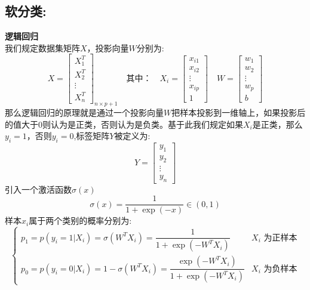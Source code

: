\documentclass[withoutpreface,bwprint]{cumcmthesis} %
\begin{document}
	\subsection{\Large 软分类:}
	\textbf{逻辑回归}\\
	我们规定数据集矩阵$X$，投影向量$W$分别为:
	\begin{equation*}
		X=\left[
			\begin{array}{c}
				X_1^T\\
				X_2^T\\
				\vdots\\
				X_n^T
			\end{array}
		\right]_{n\times{p+1}} \quad \textbf{其中：}\quad X_i=\left[
			\begin{array}{c}
				x_{i1}\\
				x_{i2}\\
				\vdots \\
				x_{ip}\\
				1
			\end{array} 
		\right] \quad W=\left[
			\begin{array}{c}
				w_{1}\\
				w_{2}\\
				\vdots\\
				w_{p}\\
				b
			\end{array}
		\right]
	\end{equation*}
	那么逻辑回归的原理就是通过一个投影向量$W$把样本投影到一维轴上，如果投影后的值大于0则认为是正类，否则认为是负类。基于此我们规定如果$X_i$是正类，那么$y_i=1$，否则$y_i=0$,标签矩阵$Y$被定义为:
	\begin{equation*}
		Y=\left[
			\begin{array}{c}
				y_1\\
				y_2\\
				\vdots\\
				y_n
			\end{array}
		\right]
	\end{equation*}
	引入一个激活函数$\sigma(x)$
		\begin{equation*}
			\sigma(x)=\dfrac{1}{1+\exp(-x)} \in (0,1)
		\end{equation*}
	样本$x_i$属于两个类别的概率分别为:
	\begin{equation}
		\begin{cases}
			p_1=p(y_i=1|X_i)=\sigma(W^TX_i)=\dfrac{1}{1+\exp(-W^TX_i)} & \textbf{$X_i$ 为正样本}\\
			p_0=p(y_i=0|X_i)=1-\sigma(W^TX_i)=\dfrac{\exp(-W^TX_i)}{1+\exp(-W^TX_i)} & \textbf{$X_i$ 为负样本}	
		\end{cases}
	\end{equation}
\end{document}
